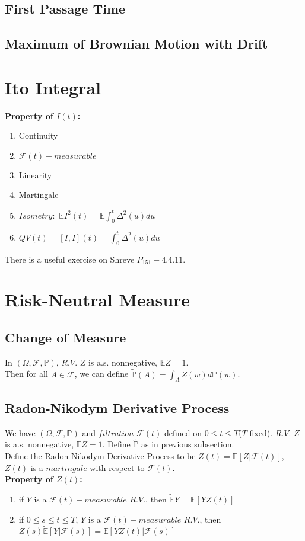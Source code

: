 \documentclass[a4paper, 11pt]{article}
\begin{document}
\subsection{First Passage Time}

\subsection{Maximum of Brownian Motion with Drift}

\section{Ito Integral}
\textbf{Property of $I(t)$: }
\begin{enumerate}
	\item Continuity
	\item $\mathcal{F}(t)-measurable$
	\item Linearity
	\item Martingale
	\item $Isometry:$ $\mathbb{E}I^2(t) = \mathbb{E}\int^t_0{\Delta^2(u) du}$
	\item $QV(t) = [I, I](t) = \int^t_0{\Delta^2(u) du}$ 
\end{enumerate}

\indent There is a useful exercise on Shreve $P_{151} - 4.4.11$.

\section{Risk-Neutral Measure}

\subsection{Change of Measure}
In $(\Omega, \mathcal{F}, \mathbb{P})$, $R.V.$ $Z$ is a.s. nonnegative, $\mathbb{E}Z = 1$.\\
\indent Then for all $A \in \mathcal{F}$, we can define $\widetilde{\mathbb{P}}(A) = \int_A{Z(w)d\mathbb{P}(w)}$.

\subsection{Radon-Nikodym Derivative Process}
We have $(\Omega, \mathcal{F}, \mathbb{P})$ and $filtration$ $\mathcal{F}(t)$ defined on $0 \leq t \leq T$($T$ fixed). $R.V.$ $Z$ is a.s. nonnegative, $\mathbb{E}Z = 1$. Define $\widetilde{\mathbb{P}}$ as in previous subsection.\\
\indent Define the Radon-Nikodym Derivative Process to be $Z(t) = \mathbb{E}[Z|\mathcal{F}(t)]$, $Z(t)$ is a $martingale$ with respect to $\mathcal{F}(t)$.\\
\textbf{Property of $Z(t)$: }
\begin{enumerate}
	\item if $Y$ is a $\mathcal{F}(t)-measurable$ $R.V.$, then $\widetilde{\mathbb{E}}Y = \mathbb{E}[YZ(t)]$
	\item if $0 \leq s \leq t \leq T$, $Y$ is a $\mathcal{F}(t)-measurable$ $R.V.$, then \\$Z(s) \widetilde{\mathbb{E}}[Y|\mathcal{F}(s)] = \mathbb{E}[YZ(t)|\mathcal{F}(s)]$
\end{enumerate}
\end{document}
